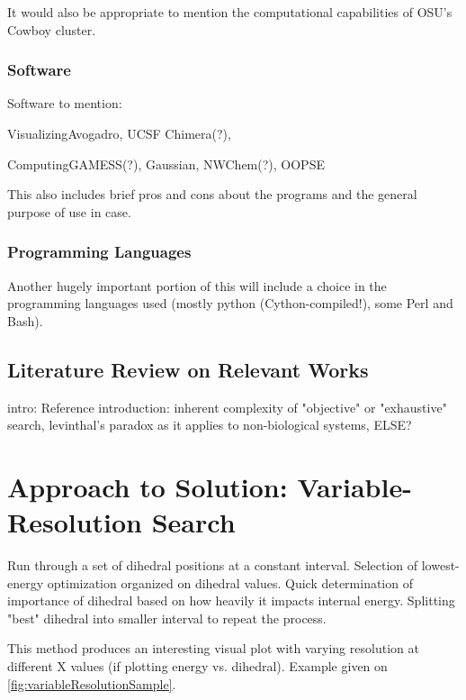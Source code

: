 It would also be appropriate to mention the computational capabilities of OSU's Cowboy cluster.

\subsubsection{Software}

Software to mention: 

Visualizing{Avogadro, UCSF Chimera(?)}, 

Computing{GAMESS(?), Gaussian, NWChem(?), OOPSE}

This also includes brief pros and cons about the programs and the general purpose of use in case.

\subsubsection{Programming Languages}

Another hugely important portion of this will include a choice in the programming languages used (mostly python (Cython-compiled!), some Perl and Bash).

\subsection{Literature Review on Relevant Works}











intro: 
Reference introduction: inherent complexity of "objective" or "exhaustive" search, levinthal's paradox as it applies to non-biological systems, ELSE?

\section{Approach to Solution: Variable-Resolution Search}

Run through a set of dihedral positions at a constant interval. 
Selection of lowest-energy optimization organized on dihedral values. 
Quick determination of importance of dihedral based on how heavily it impacts internal energy. 
Splitting "best" dihedral into smaller interval to repeat the process. 

This method produces an interesting visual plot with varying resolution at different X values (if plotting energy vs. dihedral).
Example given on \ref{fig:variableResolutionSample}.

